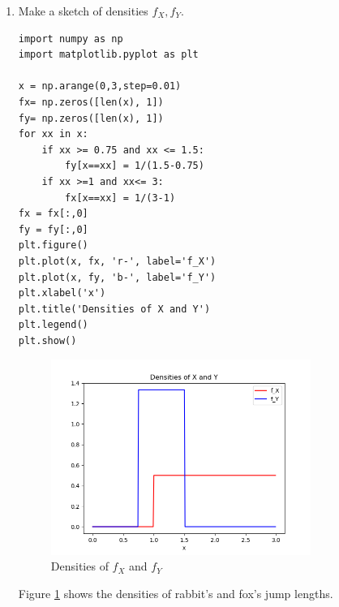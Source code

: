 \documentclass[preprint,12pt]{elsarticle}
\begin{document}
    \begin{enumerate}
        \item Make a sketch of densities $f_X, f_Y$.
        \begin{lstlisting}
import numpy as np
import matplotlib.pyplot as plt

x = np.arange(0,3,step=0.01)
fx= np.zeros([len(x), 1])
fy= np.zeros([len(x), 1])
for xx in x:
    if xx >= 0.75 and xx <= 1.5:
        fy[x==xx] = 1/(1.5-0.75)
    if xx >=1 and xx<= 3:
        fx[x==xx] = 1/(3-1)
fx = fx[:,0]
fy = fy[:,0]
plt.figure()
plt.plot(x, fx, 'r-', label='f_X')
plt.plot(x, fy, 'b-', label='f_Y')
plt.xlabel('x')
plt.title('Densities of X and Y')
plt.legend()
plt.show()
        \end{lstlisting}
        \begin{figure}[htbp!]
            \center
            \includegraphics[width=0.8\textwidth]{7.png}
            \caption{Densities of $f_X$ and $f_Y$}
            \label{fig:7}
        \end{figure}
        Figure \ref{fig:7} shows the densities of rabbit's and fox's
        jump lengths.


\end{enumerate}
\end{document}
